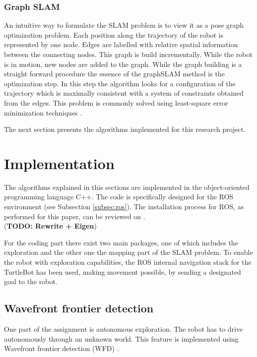\documentclass{ba-kecs}
\begin{document}
\subsubsection{Graph SLAM}
An intuitive way to formulate the SLAM problem is to view it as a pose graph optimization problem. Each position along the trajectory of the robot is represented by one node. Edges are labelled with relative spatial information between the connecting nodes. This graph is build incrementally. While the robot is in motion, new nodes are added to the graph. While the graph building is a straight forward procedure the essence of the graphSLAM method is the optimization step. In this step the algorithm looks for a configuration of the trajectory which is maximally consistent with a system of constraints obtained from the edges. This problem is commonly solved using least-square error minimization techniques \citep{Grisetti}.

The next section presents the algorithms implemented for this research project.

\section{Implementation}
\label{sec:impl}

The algorithms explained in this sections are implemented in the object-oriented programming language C++. The code is specifically designed for the ROS environment (see Subsection \ref{subsec:ros}). The installation process for ROS, as performed for this paper, can be reviewed on \cite{swarmlab}.\\

(\textbf{TODO: Rewrite + Eigen})

For the coding part there exist two main packages, one of which includes the exploration and the other one the mapping part of the SLAM problem. To enable the robot with exploration capabilities, the ROS internal navigation stack for the TurtleBot has been used, making movement possible, by sending a designated goal to the robot.

\subsection{Wavefront frontier detection}

One part of the assignment is autonomous exploration. The robot has to drive autonomously through an unknown world. This feature is implemented using Wavefront frontier detection (WFD) \citep{Keidar}.
\end{document}

